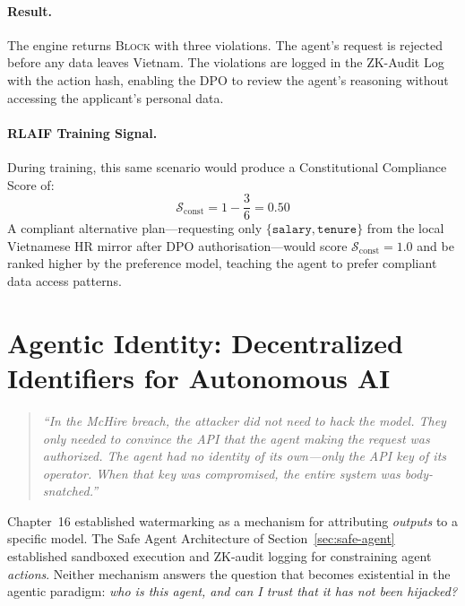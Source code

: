\paragraph{Result.}
The engine returns \textsc{Block} with three violations.
The agent's request is rejected before any data leaves
Vietnam.
The violations are logged in the ZK-Audit Log with the
action hash, enabling the DPO to review the agent's reasoning
without accessing the applicant's personal data.

\paragraph{RLAIF Training Signal.}
During training, this same scenario would produce a
Constitutional Compliance Score of:
\begin{equation}
  \mathcal{S}_{\mathrm{const}}
    = 1 - \frac{3}{6}
    = 0.50
\end{equation}
A compliant alternative plan---requesting only
$\{\texttt{salary}, \texttt{tenure}\}$ from the local
Vietnamese HR mirror after DPO authorisation---would score
$\mathcal{S}_{\mathrm{const}} = 1.0$ and be ranked higher by
the preference model, teaching the agent to prefer compliant
data access patterns.

\section{Agentic Identity: Decentralized Identifiers for
         Autonomous AI}
\label{sec:agentic-identity}

\begin{quote}
\textit{``In the McHire breach, the attacker did not need to hack
the model.
They only needed to convince the API that the agent making the
request was authorized.
The agent had no identity of its own---only the API key of its
operator.
When that key was compromised, the entire system was
body-snatched.''}
\end{quote}

Chapter~16 established watermarking as a mechanism for attributing
\emph{outputs} to a specific model.
The Safe Agent Architecture of Section~\ref{sec:safe-agent}
established sandboxed execution and ZK-audit logging for
constraining agent \emph{actions}.
Neither mechanism answers the question that becomes existential
in the agentic paradigm: \emph{who is this agent, and can I
trust that it has not been hijacked?}

